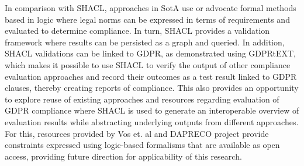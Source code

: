 In comparison with SHACL, approaches in SotA use or advocate formal methods based in logic where legal norms can be expressed in terms of requirements and evaluated to determine compliance.
In turn, SHACL provides a validation framework where results can be persisted as a graph and queried. In addition, SHACL validations can be linked to GDPR, as demonstrated using GDPRtEXT, which makes it possible to use SHACL to verify the output of other compliance evaluation approaches and record their outcomes as a test result linked to GDPR clauses, thereby creating reports  of compliance.
This also provides an opportunity to explore reuse of existing approaches and resources regarding evaluation of GDPR compliance where SHACL is used to generate an interoperable overview of evaluation results while abstracting underlying outputs from different approaches.
For this, resources provided by Vos et. al \cite{vos_odrl_2019} and DAPRECO project \cite{bartolini_agile_2019} provide constraints expressed using logic-based formalisms that are available as open access, providing future direction for applicability of this research.
